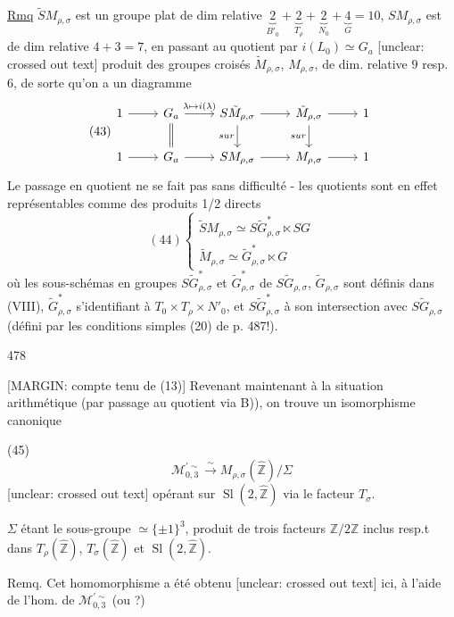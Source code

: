 \begin{enumerate}
\underline{Rmq} $\tilde{S}M_{\rho,\sigma}$ est un groupe plat de dim relative
$\underbrace{2}_{B'_0} + \underbrace{2}_{T_\rho} + \underbrace{2}_{N_0} + \underbrace{4}_{G} = 10$, $SM_{\rho,\sigma}$ est de dim relative
$4+3=7$, en passant au quotient par $i(L_0) \simeq G_a$
[unclear: crossed out text]
produit des groupes croisés $\tilde{M}_{\rho,\sigma}$, $M_{\rho,\sigma}$,
de dim. relative $9$ resp. $6$, de sorte qu'on
a un diagramme
$$
(43) \begin{tikzcd}
1 \ar[r] & G_a \ar[r, "\lambda \mapsto i(\lambda)"] \ar[d, equal] & S\tilde{M}_{\rho,\sigma} \ar[r] \ar[d, "sur"'] & \tilde{M}_{\rho,\sigma} \ar[r] \ar[d, "sur"'] & 1 \\
1 \ar[r] & G_a \ar[r] & SM_{\rho,\sigma} \ar[r] & M_{\rho,\sigma} \ar[r] & 1
\end{tikzcd}
$$
Le passage en quotient ne se fait pas sans
difficulté - les quotients sont en effet
représentables comme des produits 1/2 directs
$$
(44) \begin{cases} 
\tilde{S}M_{\rho,\sigma} \simeq S\tilde{G}_{\rho,\sigma}^* \ltimes SG \\ 
\tilde{M}_{\rho,\sigma} \simeq \tilde{G}_{\rho,\sigma}^* \ltimes G 
\end{cases}
$$
où les sous-schémas en groupes
$S\tilde{G}_{\rho,\sigma}^*$ et $\tilde{G}_{\rho,\sigma}^*$ de $S\tilde{G}_{\rho,\sigma}$, $\tilde{G}_{\rho,\sigma}$
sont définis dans (VIII), $\tilde{G}_{\rho,\sigma}^*$ s'identifiant
à $T_0 \times T_\rho \times N'_0$, et $S\tilde{G}_{\rho,\sigma}^*$ à son intersection
avec $S\tilde{G}_{\rho,\sigma}$ (défini par les conditions
simples (20) de p. 487!).

\newpage


478

[MARGIN: compte tenu de (13)]
Revenant maintenant à la situation arithmétique (par passage au quotient via B)), on trouve un isomorphisme canonique

(45) $$ \mathcal{M}_{0,3}^{\prime \sim} \overset{\sim}{\longrightarrow} M_{\rho,\sigma}(\hat{\mathbb{Z}})/\Sigma $$
[unclear: crossed out text]
opérant sur $\operatorname{Sl}(2,\hat{\mathbb{Z}})$ via le facteur $T_{\sigma}$.

$\Sigma$ étant le sous-groupe $\simeq \{\pm 1\}^3$, produit de trois facteurs $\mathbb{Z}/2\mathbb{Z}$ inclus resp.t dans $T_{\rho}(\hat{\mathbb{Z}})$, $T_{\sigma}(\hat{\mathbb{Z}})$ et $\operatorname{Sl}(2,\hat{\mathbb{Z}})$.

Remq. Cet homomorphisme a été obtenu [unclear: crossed out text] ici, à l'aide de l'hom. de $\mathcal{M}_{0,3}^{\prime \sim}$ (ou ?)


\end{enumerate}
